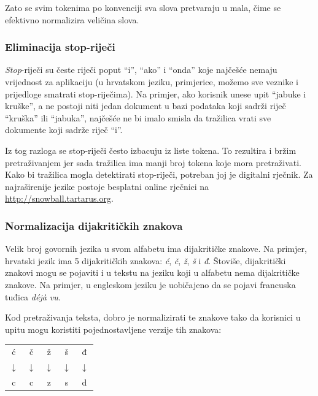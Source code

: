 \documentclass[a4paper,twoside,12pt]{scrreprt}
\newenvironment{nscenter}
 {\par\nopagebreak\centering}
 {\parskip=0pt\par\noindent\ignorespacesafterend}
\begin{document}
Zato se svim tokenima po konvenciji sva slova pretvaraju u mala, čime se efektivno normalizira veličina slova.

\subsubsection{Eliminacija stop-riječi}

\textit{Stop}-riječi su česte riječi poput ``i'', ``ako'' i ``onda'' koje najčešće nemaju vrijednost za aplikaciju (u hrvatskom jeziku, primjerice, možemo sve veznike i prijedloge smatrati stop-riječima). Na primjer, ako korisnik unese upit ``jabuke i kruške'', a ne postoji niti jedan dokument u bazi podataka koji sadrži riječ ``kruška'' ili ``jabuka'', najčešće ne bi imalo smisla da tražilica vrati sve dokumente koji sadrže riječ ``i''.

Iz tog razloga se stop-riječi često izbacuju iz liste tokena. To rezultira i bržim pretraživanjem jer sada tražilica ima manji broj tokena koje mora pretraživati. Kako bi tražilica mogla detektirati stop-riječi, potreban joj je digitalni rječnik. Za najraširenije jezike postoje besplatni online rječnici na \url{http://snowball.tartarus.org}.

\subsubsection{Normalizacija dijakritičkih znakova}

Velik broj govornih jezika u svom alfabetu ima dijakritičke znakove. Na primjer, hrvatski jezik ima 5 dijakritičkih znakova: \textit{ć}, \textit{č}, \textit{ž}, \textit{š} i \textit{đ}. Štoviše, dijakritički znakovi mogu se pojaviti i u tekstu na jeziku koji u alfabetu nema dijakritičke znakove. Na primjer, u engleskom jeziku je uobičajeno da se pojavi francuska tuđica \textit{déjà vu}.

Kod pretraživanja teksta, dobro je normalizirati te znakove tako da korisnici u upitu mogu koristiti pojednostavljene verzije tih znakova:

\begin{nscenter}
  \begin{tabular}{ccccc}
    ć            & č            & ž            & š            & đ            \\
    $\downarrow$ & $\downarrow$ & $\downarrow$ & $\downarrow$ & $\downarrow$ \\
    c            & c            & z            & s            & d            \\
  \end{tabular}
\end{nscenter}
\end{document}
